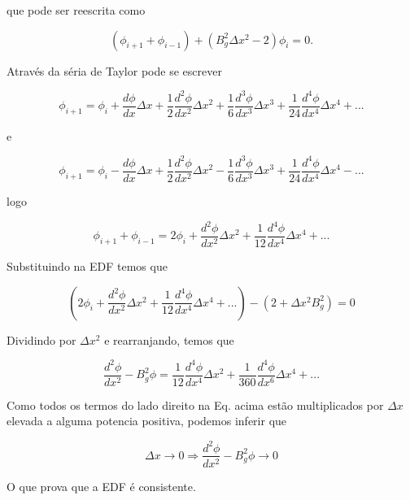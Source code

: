 \documentclass{article}
\begin{document}
        que pode ser reescrita como

        \begin{equation}
            ( \phi_{i+1} + \phi_{i-1} )  + (B_g^2 \Delta x^2  -  2) \phi_i = 0.
        \end{equation}

        Através da séria de Taylor pode se escrever

        \begin{equation}
            \phi_{i+1} = \phi_{i}  + \frac{d\phi}{dx} \Delta x  +  \frac{1}{2}\frac{d^2\phi}{dx^2} \Delta x^2  +  \frac{1}{6}\frac{d^3\phi}{dx^3} \Delta x^3 + \frac{1}{24}\frac{d^4\phi}{dx^4} \Delta x^4 + ...
        \end{equation}

        e

        \begin{equation}
            \phi_{i+1} = \phi_{i}  - \frac{d\phi}{dx} \Delta x  +  \frac{1}{2}\frac{d^2\phi}{dx^2} \Delta x^2  -  \frac{1}{6}\frac{d^3\phi}{dx^3} \Delta x^3 + \frac{1}{24}\frac{d^4\phi}{dx^4} \Delta x^4 - ...
        \end{equation}

        logo

        \begin{equation}
            \phi_{i+1} + \phi_{i-1}    =     2\phi_{i}   +  \frac{d^2\phi}{dx^2} \Delta x^2  + \frac{1}{12}\frac{d^4\phi}{dx^4} \Delta x^4 + ...
        \end{equation}
        
        Substituindo na EDF temos que

        \begin{equation}
            (2\phi_{i}   +  \frac{d^2\phi}{dx^2} \Delta x^2  + \frac{1}{12}\frac{d^4\phi}{dx^4} \Delta x^4 + ...) - (2 + \Delta x^2 B_g^2 ) = 0
        \end{equation}

        Dividindo por $\Delta x^2$ e rearranjando, temos que 

        \begin{equation}
            \frac{d^2 \phi}{dx^2}  - B_g^2 \phi =  \frac{1}{12}\frac{d^4\phi}{dx^4} \Delta x^2 + \frac{1}{360}\frac{d^4\phi}{dx^6} \Delta x^4 + ...
        \end{equation}

        Como todos os termos do lado direito na Eq. acima estão multiplicados por $\Delta x$ elevada a alguma potencia positiva, podemos inferir que
        
        \begin{equation}
            \Delta x \rightarrow 0      \Rightarrow       \frac{d^2 \phi}{dx^2}  - B_g^2 \phi   \rightarrow 0
        \end{equation}

        O que prova que a EDF é consistente.
        
\end{document}
